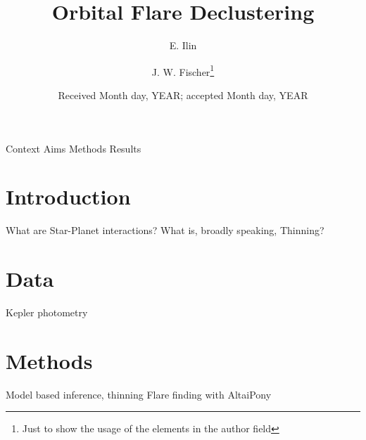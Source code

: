 \documentclass{aa}
\begin{document}
 


   \title{Orbital Flare Declustering}


   \author{E. Ilin
          \and
          J. W. Fischer\fnmsep\thanks{Just to show the usage
          of the elements in the author field}
          }


   \date{Received Month day, YEAR; accepted Month day, YEAR}

 
  \abstract
   {Context}
   {Aims}
   {Methods}
   {Results}
   {}

   \keywords{ --%
                 --
                
               }

   \maketitle
%

\section{Introduction}
What are Star-Planet interactions?
What is, broadly speaking, Thinning?


\section{Data}
Kepler photometry

\section{Methods}
Model based inference, thinning
Flare finding with AltaiPony
\end{document}

